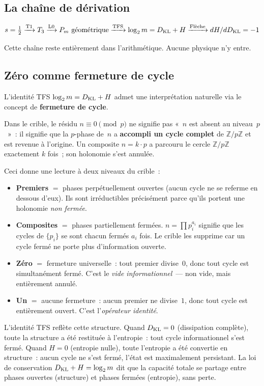 \documentclass[12pt,a4paper]{article}
\begin{document}
\subsection{La chaîne de dérivation}
\label{sec:ch4_chain}

\[
  s = \tfrac{1}{2}
  \xrightarrow{\text{T1}} T_3
  \xrightarrow{\text{L0}} P_m \text{ géométrique}
  \xrightarrow{\text{TFS}} \log_2 m = D_{\mathrm{KL}} + H \xrightarrow{\text{Flèche}} dH/dD_{\mathrm{KL}} = -1
\]

Cette chaîne reste entièrement dans l'arithmétique. Aucune physique
n'y entre.

\subsection{Zéro comme fermeture de cycle}
\label{sec:ch4_zero}

L'identité TFS $\log_2 m = D_{\mathrm{KL}} + H$ admet une interprétation
naturelle via le concept de \textbf{fermeture de cycle}.

\begin{remarque}
\label{rem:zero_phase_gft}
Dans le crible, le résidu $n \equiv 0 \pmod{p}$ ne signifie pas
«~$n$ est absent au niveau~$p$~»~: il signifie que la $p$-phase de~$n$
a \textbf{accompli un cycle complet} de $\mathbb{Z}/p\mathbb{Z}$ et
est revenue à l'origine. Un composite $n = k \cdot p$ a parcouru le
cercle $\mathbb{Z}/p\mathbb{Z}$ exactement $k$ fois~; son holonomie
s'est annulée.

Ceci donne une lecture à deux niveaux du crible~:
\begin{itemize}[nosep]
\item \textbf{Premiers} $=$ phases perpétuellement ouvertes (aucun
  cycle ne se referme en dessous d'eux). Ils sont irréductibles
  précisément parce qu'ils portent une holonomie \emph{non fermée}.
\item \textbf{Composites} $=$ phases partiellement fermées.
  $n = \prod p_i^{a_i}$ signifie que les cycles de $\{p_i\}$ se sont
  chacun fermés $a_i$ fois. Le crible les supprime car un cycle
  fermé ne porte plus d'information ouverte.
\item \textbf{Zéro} $=$ fermeture universelle~: tout premier divise~$0$,
  donc tout cycle est simultanément fermé. C'est le \emph{vide
  informationnel}~--- non vide, mais entièrement annulé.
\item \textbf{Un} $=$ aucune fermeture~: aucun premier ne divise~$1$,
  donc tout cycle est entièrement ouvert. C'est l'\emph{opérateur
  identité}.
\end{itemize}

L'identité TFS reflète cette structure. Quand $D_{\mathrm{KL}} = 0$ (dissipation
complète), toute la structure a été restituée à l'entropie~: tout
cycle informationnel s'est fermé. Quand $H = 0$ (entropie nulle),
toute l'entropie a été convertie en structure~: aucun cycle ne s'est
fermé, l'état est maximalement persistant. La loi de conservation
$D_{\mathrm{KL}} + H = \log_2 m$ dit que la capacité totale se partage entre
phases ouvertes (structure) et phases fermées (entropie), sans perte.
\end{remarque}
\end{document}
